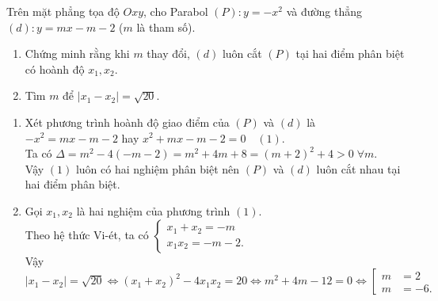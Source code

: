 \begin{ex}%
	Trên mặt phẳng tọa độ $Oxy$, cho Parabol $(P):y=-x^2$ và đường thẳng $(d):y=mx-m-2$ ($m$ là tham số).
	\begin{enumerate}
		\item Chứng minh rằng khi $m$ thay đổi, $(d)$ luôn cắt $(P)$ tại hai điểm phân biệt có hoành độ $x_1,x_2$.
		\item Tìm $m$ để $|x_1-x_2|=\sqrt{20}$.
	\end{enumerate}
	\loigiai
    {
    \begin{enumerate}
        \item Xét phương trình hoành độ giao điểm của $(P)$ và $(d)$ là\\
        $-x^2=mx-m-2$ hay $x^2+mx-m-2=0\quad (1)$.\\
        Ta có $\Delta=m^2-4(-m-2)=m^2+4m+8=(m+2)^2+4>0\;\forall m$.\\
        Vậy $(1)$ luôn có hai nghiệm phân biệt nên $(P)$ và $(d)$ luôn cắt nhau tại hai điểm phân biệt.
        \item Gọi $x_1,x_2$ là hai nghiệm của phương trình $(1)$.\\
        Theo hệ thức Vi-ét, ta có $\begin{cases}
        	x_1+x_2=-m\\ x_1x_2=-m-2.
        \end{cases}$\\
        Vậy $|x_1-x_2|=\sqrt{20}\Leftrightarrow (x_1+x_2)^2-4x_1x_2=20\Leftrightarrow m^2+4m-12=0\Leftrightarrow \left[ \begin{aligned}
        m&=2\\m&=-6.
        \end{aligned}\right.$
    \end{enumerate}
    }
\end{ex}

